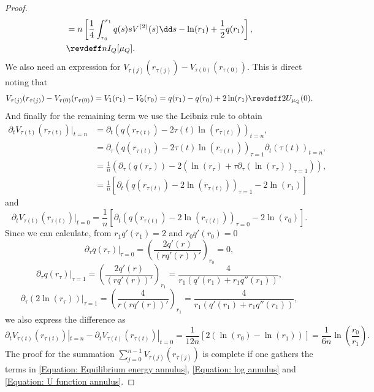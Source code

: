 \begin{proof}
\begin{align}
		& = n \left[\frac{1}{4} \int_{r_0}^{r_1} q(s) s V^{(2)}(s) \dd s- \ln(r_1) + \frac{1}{2} q(r_1) \right],  \\
		& \revdeff n I_Q[\mu_Q].
		\label{Equation: Equilibrium energy annulus}
	\end{align}
	We also need an expression for $ V_{\tau(j)}(r_{\tau(j)})  - V_{\tau(0)}(r_{\tau(0)})$. This is direct noting that
	\begin{equation}
		V_{\tau(j)}(r_{\tau(j)})  - V_{\tau(0)}(r_{\tau(0)}) = V_1(r_1) - V_0(r_0) = q(r_1) - q(r_0) + 2 \ln(r_1) \revdeff 2 U_{\mu_Q}(0).
		\label{Equation: U function annulus}
	\end{equation}
	And finally for the remaining term we use the Leibniz rule to obtain
	\begin{align}
		\partial_t V_{\tau(t)}(r_{\tau(t)})|_{t=n}	& = \partial_t \left( q(r_{\tau(t)}) - 2 \tau(t) \ln(r_{\tau(t)}) \right)_{t=n}, \\
		& = \partial_\tau \left( q(r_{\tau(t)}) - 2 \tau(t) \ln(r_{\tau(t)}) \right)_{\tau=1} \partial_t \left( \tau(t) \right)_{t =n}, \\
		& = \frac{1}{n} \left( \partial_\tau (q(r_{\tau})) - 2 \left( \ln(r_{\tau}) + \tau \partial_\tau\left( \ln(r_{\tau}) \right)_{\tau = 1} \right) \right), \\
		& = \frac{1}{n} \left[ \partial_t(q(r_{\tau(t)}) - 2 \ln(r_{\tau(t)}))_{\tau=1} - 2 \ln(r_1) \right]
	\end{align}
	and
	\begin{equation}
		\partial_t V_{\tau(t)}(r_{\tau(t)})|_{t=0} = \frac{1}{n} \left[ \partial_t(q(r_{\tau(t)}) - 2 \ln(r_{\tau(t)}))_{\tau= 0} - 2 \ln(r_0) \right].
	\end{equation}
	Since we can calculate, from $r_1 q'(r_1) = 2$ and $r_0 q'(r_0) = 0$
	\begin{equation}
		\partial_\tau q(r_{\tau}) |_{\tau = 0} = \left( \frac{2 q'(r)}{(r q'(r))'}\right)_{r_0} = 0,
	\end{equation}
	\begin{equation}
		\partial_\tau q(r_{\tau}) |_{\tau = 1} = \left( \frac{2 q'(r)}{(r q'(r))'}\right)_{r_1} = \frac{4}{r_1(q'(r_1) + r_1 q''(r_1))},
	\end{equation}
	\begin{equation}
		\partial_\tau (2 \ln(r_\tau)) |_{\tau = 1} = \left( \frac{4}{r (r q'(r))'}\right)_{r_1} = \frac{4}{r_1(q'(r_1) + r_1 q''(r_1))},
	\end{equation}
	we also express the difference as
	\begin{equation}
		\partial_t V_{\tau(t)}(r_{\tau(t)})|_{t=n}  - \partial_t V_{\tau(t)}(r_{\tau(t)})|_{t=0} = \frac{1}{12 n} \left[ 2 (\ln(r_0) - \ln(r_1)) \right] = \frac{1}{6 n} \ln\left(\frac{r_0}{r_1}\right) .
		\label{Equation: log annulus}
	\end{equation}
	The proof for the summation $\sum_{j=0}^{n-1} V_{\tau(j)}(r_{\tau(j)})$ is complete if one gathers the terms in \eqref{Equation: Equilibrium energy annulus}, \eqref{Equation: log annulus} and \eqref{Equation: U function annulus}.

\end{proof}

